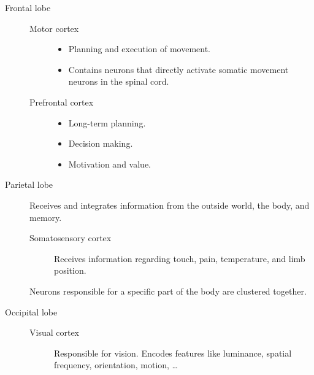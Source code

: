 \begin{description}
\begin{description}
            \begin{description}
                \item[Frontal lobe] 
                    \phantom{}
                    \begin{description}
                        \item[Motor cortex] \phantom{}
                            \begin{itemize}
                                \item Planning and execution of movement.
                                \item Contains neurons that directly activate somatic movement neurons in the spinal cord.
                            \end{itemize}

                        \item[Prefrontal cortex] \phantom{}
                            \begin{itemize}
                                \item Long-term planning.
                                \item Decision making.
                                \item Motivation and value.
                            \end{itemize}
                    \end{description}
                

                \item[Parietal lobe] 
                    Receives and integrates information from the outside world, the body, and memory.

                    \begin{description}
                        \item[Somatosensory cortex]
                            Receives information regarding touch, pain, temperature, and limb position.
                    \end{description}

                    \begin{remark}
                        Neurons responsible for a specific part of the body are clustered together.
                    \end{remark}


                \item[Occipital lobe] 
                    \begin{description}
                        \item[Visual cortex] 
                            Responsible for vision. 
                            Encodes features like luminance, spatial frequency, orientation, motion, \dots
                    \end{description}


\end{description}
\end{description}
\end{description}

